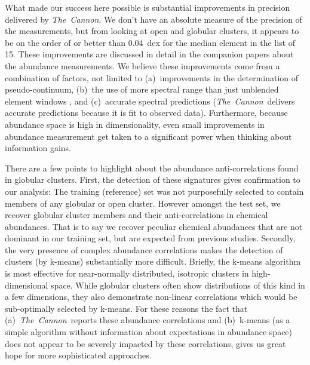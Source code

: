 \documentclass[12pt, letterpaper, preprint]{aastex}
\newcommand{\project}[1]{\textsl{#1}}
\newcommand{\thecannon}{\project{The~Cannon}}
\begin{document}
What made our success here possible is substantial improvements in precision
delivered by \thecannon.
We don't have an absolute measure of the precision of the measurements,
but from looking at open and globular clusters, it appears to be on the
order of or better than 0.04~dex for the median element in the list of 15.
These improvements are discussed in detail in the companion papers
\citep{casey16, ness16} about the abundance measurements.
We believe these improvements come from a combination of factors, not
limited to (a)~improvements in the determination of pseudo-continuum,
(b)~the use of more spectral range than just unblended element windows
\citep{aspcap}, and (c)~accurate spectral predictions
(\thecannon\ delivers accurate predictions because it is fit to
observed data). 
Furthermore, because abundance space is high in dimensionality, even
small improvements in abundance measurement get taken to a significant
power when thinking about information gains.

There are a few points to highlight about the abundance anti-correlations
found in globular clusters. First, the detection of these signatures gives
confirmation to our analysis: The training (reference) set was not purposefully selected
to contain members of any globular or open cluster. However amongst the test
set, we recover globular cluster members and their anti-correlations 
in chemical abundances. That is to
say we recover peculiar chemical abundances that are not dominant in our
training set, but are expected from previous studies. Secondly, the very
presence of complex abundance correlations makes the detection of clusters
(by k-means) substantially more difficult. Briefly, the k-means algorithm
is most effective for near-normally distributed, isotropic clusters in high-dimensional space.
While globular clusters often show distributions of this kind in a few dimensions,
they also demonstrate non-linear correlations which would be
sub-optimally selected by k-means. For these reasons the fact that (a)~\thecannon\
reports these abundance correlations and (b)~k-means (as a simple algorithm
without information about expectations in abundance space) does not appear to be
severely impacted by these correlations, gives us great hope for more sophisticated approaches.
\end{document}
